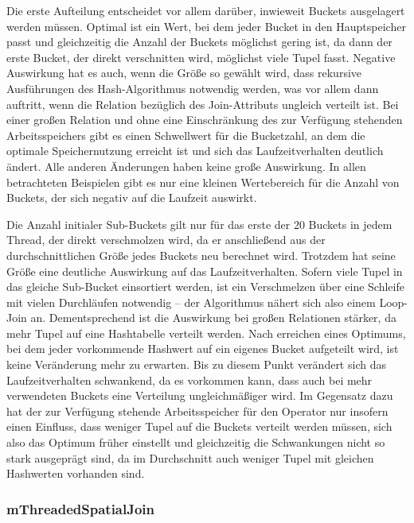\documentclass[a4paper,12pt,twoside]{article}
\begin{document}
Die erste Aufteilung entscheidet vor allem darüber, inwieweit Buckets ausgelagert werden müssen. Optimal ist ein Wert, bei dem jeder Bucket in den Hauptspeicher passt und gleichzeitig die Anzahl der Buckets möglichst gering ist, da dann der erste Bucket, der direkt verschnitten wird, möglichst viele Tupel fasst. Negative Auswirkung hat es auch, wenn die Größe so gewählt wird, dass rekursive Ausführungen des Hash-Algorithmus notwendig werden, was vor allem dann auftritt, wenn die Relation bezüglich des Join-Attributs ungleich verteilt ist. Bei einer großen Relation und ohne eine Einschränkung des zur Verfügung stehenden Arbeitsspeichers gibt es einen Schwellwert für die Bucketzahl, an dem die optimale Speichernutzung erreicht ist und sich das Laufzeitverhalten deutlich ändert. Alle anderen Änderungen haben keine große Auswirkung. In allen betrachteten Beispielen gibt es nur eine kleinen Wertebereich für die Anzahl von Buckets, der sich negativ auf die Laufzeit auswirkt.

Die Anzahl initialer Sub-Buckets gilt nur für das erste der 20 Buckets in jedem Thread, der direkt verschmolzen wird, da er anschließend aus der durchschnittlichen Größe jedes Buckets neu berechnet wird. Trotzdem hat seine Größe eine deutliche Auswirkung auf das Laufzeitverhalten. Sofern viele Tupel in das gleiche Sub-Bucket einsortiert werden, ist ein Verschmelzen über eine Schleife mit vielen Durchläufen notwendig -- der Algorithmus nähert sich also einem Loop-Join an. Dementsprechend ist die Auswirkung bei großen Relationen stärker, da mehr Tupel auf eine Hashtabelle verteilt werden. Nach erreichen eines Optimums, bei dem jeder vorkommende Hashwert auf ein eigenes Bucket aufgeteilt wird, ist keine Veränderung mehr zu erwarten. Bis zu diesem Punkt verändert sich das Laufzeitverhalten schwankend, da es vorkommen kann, dass auch bei mehr verwendeten Buckets eine Verteilung ungleichmäßiger wird. Im Gegensatz dazu hat der zur Verfügung stehende Arbeitsspeicher für den Operator nur insofern einen Einfluss, dass weniger Tupel auf die Buckets verteilt werden müssen, sich also das Optimum früher einstellt und gleichzeitig die Schwankungen nicht so stark ausgeprägt sind, da im Durchschnitt auch weniger Tupel mit gleichen Hashwerten vorhanden sind.

\subsubsection{mThreadedSpatialJoin}
\label{exp:sj}
\end{document}

